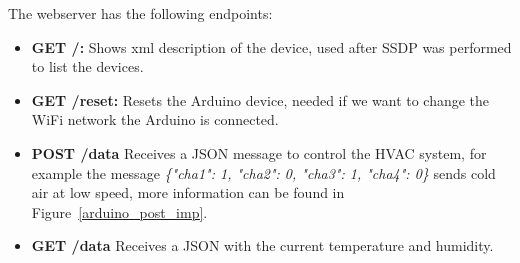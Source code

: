 The webserver has the following endpoints:


\begin{itemize}
  \item \textbf{GET /:} Shows xml description of the device, used after \ac{SSDP} was performed to list the devices.
  \item \textbf{GET /reset:} Resets the Arduino device, needed if we want to change the WiFi network the Arduino is connected.
  \item \textbf{POST /data} Receives a JSON message to control the HVAC system, for example the message \textit{\{"cha1": 1, "cha2": 0, "cha3": 1, "cha4": 0\}} sends cold air at low speed, more information can be found in Figure~\ref{arduino_post_imp}.
  
  \item \textbf{GET /data} Receives a JSON with the current temperature and humidity.
 
\end{itemize}




